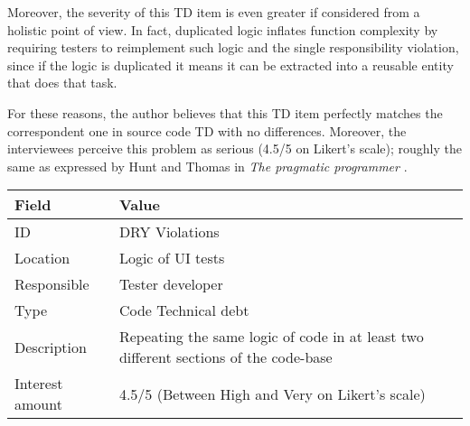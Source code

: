         \label{sec:disc-rq3-dry}
        Moreover, the severity of this TD item is even greater if considered from a holistic point of view. In fact, duplicated logic inflates function complexity by requiring testers to reimplement such logic and the single responsibility violation, since if the logic is duplicated it means it can be extracted into a reusable entity that does that task.
        
        For these reasons, the author believes that this TD item perfectly matches the correspondent one in source code TD with no differences. Moreover, the interviewees perceive this problem as serious (4.5/5 on Likert's scale); roughly the same as expressed by Hunt and Thomas in \textit{The pragmatic programmer} \cite{thomas1999pragmatic}.
    
    
    	\begin{table}[!htbp]
		\centering
		\tabulinesep=1.2mm
		\begin{tabu} to \textwidth {|X|X[3]|}
			
			\hline
			\textbf{Field} & \textbf{Value} \\ 
			\hline
			
			ID & DRY Violations \\
			\hline
			
			Location & Logic of UI tests \\
			\hline
			
			Responsible & Tester developer \\
			\hline
			
			Type & Code Technical debt \\
			\hline	
			
			Description & Repeating the same logic of code in at least two different sections of the code-base\\
			\hline
			
			
			
			Interest amount &  4.5/5 (Between High and Very on Likert's scale) \\
			\hline
			
			
			

\end{tabu}
\end{table}
